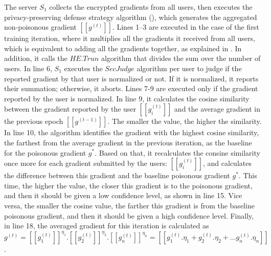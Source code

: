 The server $S_1$ collects the encrypted gradients from all users, then executes the privacy-preserving defense strategy algorithm (), which generates the aggregated non-poisonous gradient $[[g^{(t)}]]$.
Lines 1–3 are executed in the case of the first training iteration, where it multiplies all the gradients it received from all users, which is equivalent to adding all the gradients together, as explained in .
In addition, it calls the $HE.Trun$ algorithm that divides the sum over the number of users.
In line 6, $S_1$ executes the $SecJudge$ algorithm per user to judge if the reported gradient by that user is normalized or not.
If it is normalized, it reports their summation; otherwise, it aborts.
Lines 7-9 are executed only if the gradient reported by the user is normalized.
In line 9, it calculates the cosine similarity between the gradient reported by the user $[[g_i^{(t)}]]$ and the average gradient in the previous epoch $[[g^{(t-1)}]]$.
The smaller the value, the higher the similarity.
In line 10, the algorithm identifies the gradient with the highest cosine similarity, the farthest from the average gradient in the previous iteration, as the baseline for the poisonous gradient $g^*$.
Based on that, it recalculates the consine similarity once more for each gradient submitted by the users: $[[g_i^{(t)}]]$, and calculates the difference between this gradient and the baseline poisonous gradient $g^*$.
This time, the higher the value, the closer this gradient is to the poisonous gradient, and then it should be given a low confidence level, as shown in line 15.
Vice versa, the smaller the cosine value, the farther this gradient is from the baseline poisonous gradient, and then it should be given a high confidence level.
Finally, in line 18, the averaged gradient for this iteration is calculated as $g^{(t)} = [[g^{(t)}_1]]^{\eta_1} . [[g^{(t)}_2]]^{\eta_2} . [[g^{(t)}_n]]^{\eta_n} = [[g^{(t)}_1 . \eta_1 + g^{(t)}_2 . \eta_2 + ... g^{(t)}_n . \eta_n]]$.

